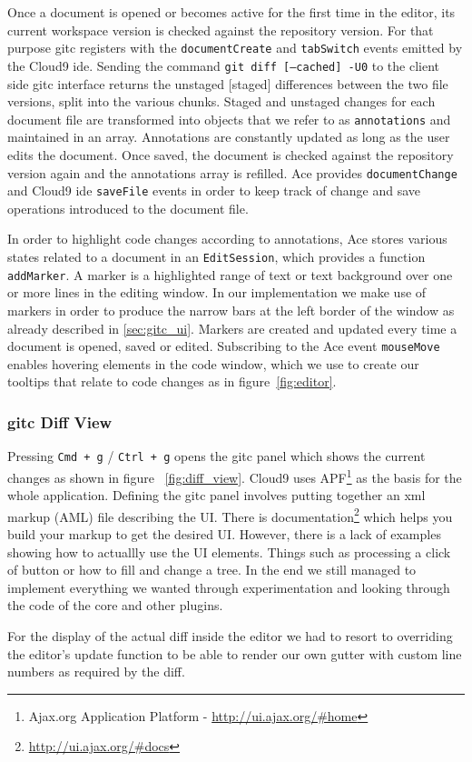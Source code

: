 Once a document is opened or becomes active for the first time in the editor, its current workspace version is checked against the repository version. 
For that purpose gitc registers with the \texttt{documentCreate} and \texttt{tabSwitch} events emitted by the Cloud9 ide. 
Sending the command \texttt{git diff [--cached] -U0} to the client side gitc interface returns the unstaged [staged] differences between the two file versions, split into the various chunks. 
Staged and unstaged changes for each document file are transformed into objects that we refer to as \texttt{annotations} and maintained in an array. Annotations are constantly updated as long as the user edits the document. 
Once saved, the document is checked against the repository version again and the annotations array is refilled. 
Ace provides \texttt{documentChange} and Cloud9 ide \texttt{saveFile} events in order to keep track of change and save operations introduced to the document file.

In order to highlight code changes according to annotations, Ace stores various states related to a document in an \texttt{EditSession}, which provides a function \texttt{addMarker}. 
A marker is a highlighted range of text or text background over one or more lines in the editing window. 
In our implementation we make use of markers in order to produce the narrow bars at the left border of the window as already described in \ref{sec:gitc_ui}. 
Markers are created and updated every time a document is opened, saved or edited. 
Subscribing to the Ace event \texttt{mouseMove} enables hovering elements in the code window, which we use to create our tooltips that relate to code changes as in figure~\ref{fig:editor}.

\subsubsection{gitc Diff View}

Pressing \texttt{Cmd + g} / \texttt{Ctrl + g} opens the gitc panel which shows the current changes as shown in figure ~\ref{fig:diff_view}.
Cloud9 uses APF\footnote{Ajax.org Application Platform - \url{http://ui.ajax.org/#home}} as the basis for the whole application.
Defining the gitc panel involves putting together an xml markup (AML) file describing the UI.
There is documentation\footnote{\url{http://ui.ajax.org/#docs}} which helps you build your markup to get the desired UI.
However, there is a lack of examples showing how to actuallly use the UI elements. Things such as processing a click of button
or how to fill and change a tree.
In the end we still managed to implement everything we wanted through experimentation and looking through the code of the core
and other plugins.

For the display of the actual diff inside the editor we had to resort to overriding the editor's update function to be able to
render our own gutter with custom line numbers as required by the diff.
